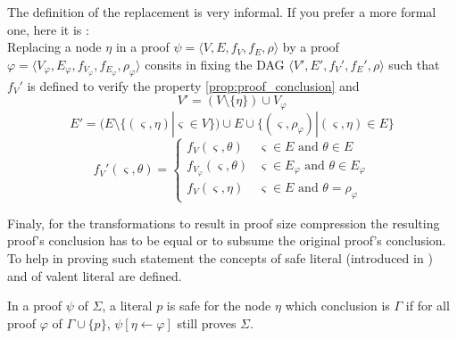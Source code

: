 \documentclass{llncs}
\begin{document}
\begin{jb}
The definition of the replacement is very informal. If you prefer a more formal one, here it is :\\
Replacing a node $\eta$ in a proof $\psi = \langle V,E,f_V,f_E,\rho \rangle$ by a proof $\varphi =
\langle V_\varphi,E_\varphi,f_{V_\varphi},f_{E_\varphi},\rho_\varphi \rangle$ consits in fixing the DAG
$\langle V',E',f_V',f_E',\rho \rangle$ such that $f_V'$ is defined to verify the property
\ref{prop:proof_conclusion} and
\begin{equation*}
  V' = (V \setminus \{\eta\}) \cup V_\varphi
\end{equation*}
\begin{equation*}
  E' = (E \setminus \{(\varsigma,\eta)|\varsigma \in V\}) \cup E \cup
       \{(\varsigma,\rho_\varphi)|(\varsigma,\eta) \in E\}
\end{equation*}
\begin{equation*}
  f_V'(\varsigma,\theta) = \begin{cases}
    f_V(\varsigma,\theta) & \varsigma \in E \text{ and } \theta \in E \\
    f_{V_\varphi}(\varsigma,\theta) & \varsigma \in E_\varphi \text{ and } \theta \in E_\varphi \\
    f_V(\varsigma,\eta) & \varsigma \in E \text{ and } \theta = \rho_\varphi
  \end{cases}
\end{equation*}
\end{jb}

Finaly, for the transformations to result in proof size compression the resulting proof's conclusion
has to be equal or to subsume the original proof's conclusion. To help in proving such statement the
concepts of safe literal (introduced in \cite{RP}) and of valent literal are defined.




\begin{definition}
In a proof $\psi$ of $\Sigma$, a literal $p$ is safe for the node $\eta$ which conclusion is $\Gamma$ if
for all proof $\varphi$ of $\Gamma \cup \{p\}$, $\psi[\eta \leftarrow \varphi]$ still proves $\Sigma$.
\end{definition}
\end{document}
